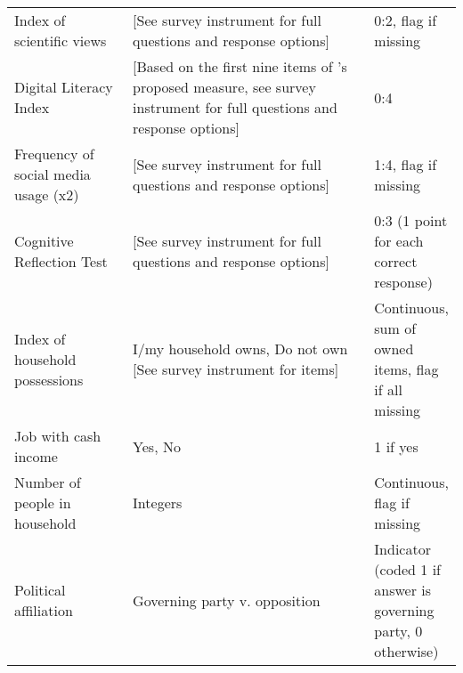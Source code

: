 \begin{table}[H]
\begin{adjustbox}{totalheight=.9\baselineskip, max width = \textwidth}
\begin{tabular}{p{0.3\linewidth}p{0.7\linewidth}p{0.25\linewidth}}
Index   of scientific views                 & [See   survey instrument for full questions and response options] & 0:2, flag if missing                     \\
Digital Literacy Index &  {[}Based on the first nine items of \cite{guessetal2020digital}'s  proposed measure, see  survey instrument for full questions and response options{]}& 0:4\\
Frequency of social media usage (x2)& {[}See   survey instrument for full questions and response options{]} & 1:4, flag if missing \\
Cognitive Reflection Test& {[}See   survey instrument for full questions and response options{]}& 0:3 (1 point for each correct response)\\
Index of household possessions%
&
  I/my household owns, Do not own [See survey instrument for items] &
  Continuous, sum of owned items, flag if all missing \\
Job   with cash income                      & Yes,   No                                                  & 1 if yes                \\
Number   of people in household             & Integers                                                   & Continuous, flag if missing              \\
Political affiliation & Governing party v. opposition & Indicator (coded 1 if answer is governing party, 0 otherwise)\\

\end{tabular}
\end{adjustbox}
\end{table}
